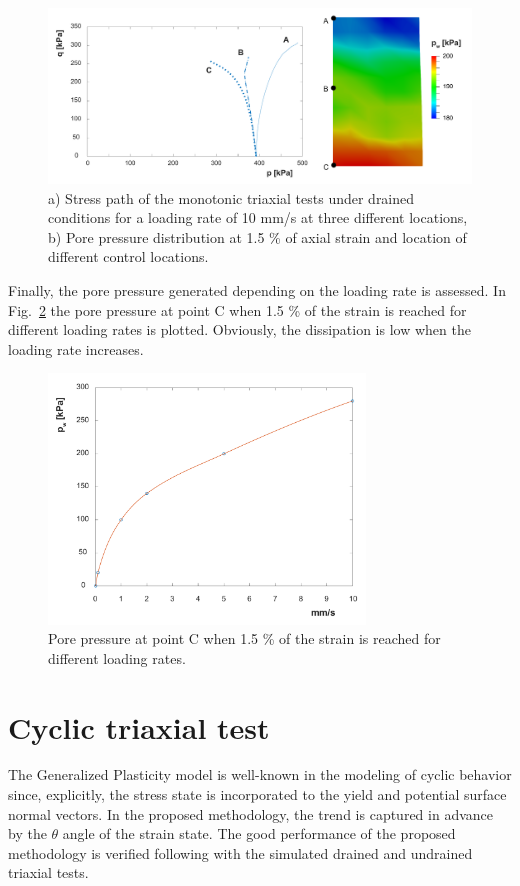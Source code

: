 \documentclass[preprint,12pt,a4paper]{elsarticle}
\begin{document}
\begin{figure}
\centering
\includegraphics[width=1.01\textwidth]{Figs/drained_abc.pdf}
\caption{a) Stress path of the monotonic triaxial tests under drained conditions for a loading rate of 10 mm/s at three different locations, b) Pore pressure distribution at 1.5 \% of axial strain and location of different control locations.}
\label{fig_drained_abc}
\end{figure}

Finally, the pore pressure generated depending on the loading rate is assessed. In Fig.~\ref{fig_pw} the pore pressure at point C when 1.5 \% of the strain is reached for different loading rates is plotted. Obviously, the dissipation is low when the loading rate increases.

\begin{figure}
\centering
\includegraphics[width=0.75\textwidth]{Figs/excess_porepressure.pdf}
\caption{Pore pressure at point C when 1.5 \% of the strain is reached for different loading rates.}
\label{fig_pw}
\end{figure}

\section{Cyclic triaxial test}
\label{sec:4}
The Generalized Plasticity model is well-known in the modeling of cyclic behavior since, explicitly, the stress state is incorporated to the yield and potential surface normal vectors. In the proposed methodology, the trend is captured in advance by the $\theta$ angle of the strain state. The good performance of the proposed methodology is verified following with the simulated drained and undrained triaxial tests.
\end{document}
